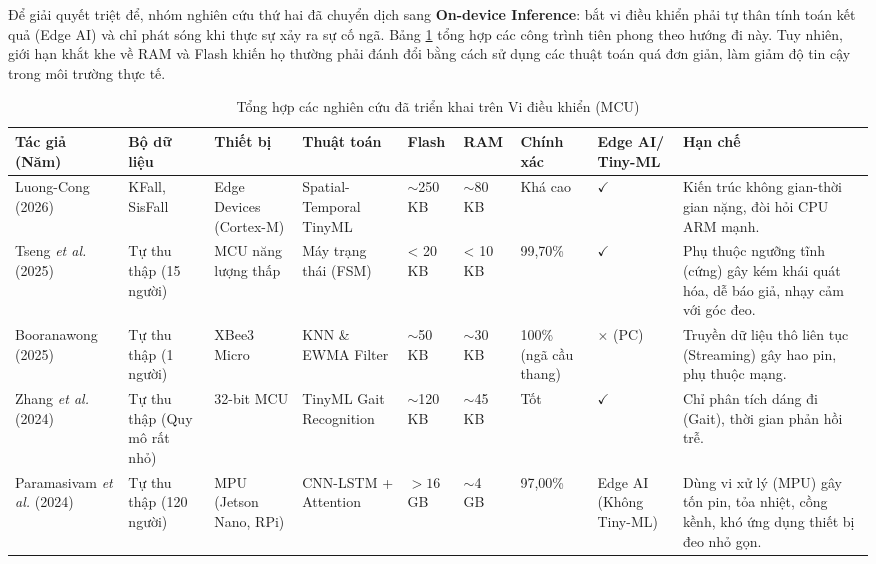 \documentclass[../DoAn.tex]{subfiles}
\begin{document}
Để giải quyết triệt để, nhóm nghiên cứu thứ hai đã chuyển dịch sang \textbf{On-device Inference}: bắt vi điều khiển phải tự thân tính toán kết quả (Edge AI) và chỉ phát sóng khi thực sự xảy ra sự cố ngã. Bảng \ref{tab:survey_mcu} tổng hợp các công trình tiên phong theo hướng đi này. Tuy nhiên, giới hạn khắt khe về RAM và Flash khiến họ thường phải đánh đổi bằng cách sử dụng các thuật toán quá đơn giản, làm giảm độ tin cậy trong môi trường thực tế.

\begin{table}[H]
    \centering
    \caption{Tổng hợp các nghiên cứu đã triển khai trên Vi điều khiển (MCU)}
    \label{tab:survey_mcu}
    \small
    \begin{tabular}{|p{2.2cm}|p{1.5cm}|p{1.5cm}|p{1.5cm}|p{1.0cm}|p{1.0cm}|p{1.2cm}|p{1.0cm}|p{2.5cm}|}
        \hline
        \textbf{Tác giả (Năm)} & \textbf{Bộ dữ liệu} & \textbf{Thiết bị} & \textbf{Thuật toán} & \textbf{Flash} & \textbf{RAM} & \textbf{Chính xác} & \textbf{Edge AI/ Tiny-ML} & \textbf{Hạn chế} \\
        \hline
        Luong-Cong (2026) \cite{LuongCong2026Energy} & KFall, SisFall & Edge Devices (Cortex-M) & Spatial-Temporal TinyML & $\sim$250 KB & $\sim$80 KB & Khá cao & $\checkmark$ & Kiến trúc không gian-thời gian nặng, đòi hỏi CPU ARM mạnh. \\
        \hline
        Tseng \textit{et al.} (2025) \cite{tseng2025wearable} & Tự thu thập (15 người) & MCU năng lượng thấp & Máy trạng thái (FSM) & < 20 KB & < 10 KB & 99,70\% & $\checkmark$ & Phụ thuộc ngưỡng tĩnh (cứng) gây kém khái quát hóa, dễ báo giả, nhạy cảm với góc đeo. \\
        \hline
        Booranawong (2025) \cite{booranawong2025stairs} & Tự thu thập (1 người) & XBee3 Micro & KNN \& EWMA Filter & $\sim$50 KB & $\sim$30 KB & 100\% (ngã cầu thang) & $\times$ (PC) & Truyền dữ liệu thô liên tục (Streaming) gây hao pin, phụ thuộc mạng. \\
        \hline
        Zhang \textit{et al.} (2024) \cite{zhang2024gait} & Tự thu thập (Quy mô rất nhỏ) & 32-bit MCU & TinyML Gait Recognition & $\sim$120 KB & $\sim$45 KB & Tốt & $\checkmark$ & Chỉ phân tích dáng đi (Gait), thời gian phản hồi trễ. \\
        \hline
        Paramasivam \textit{et al.} (2024) \cite{Paramasivam2024Heliyon} & Tự thu thập (120 người) & MPU (Jetson Nano, RPi) & CNN-LSTM + Attention & $>16$ GB & $\sim$4 GB & 97,00\% & Edge AI (Không Tiny-ML) & Dùng vi xử lý (MPU) gây tốn pin, tỏa nhiệt, cồng kềnh, khó ứng dụng thiết bị đeo nhỏ gọn. \\
        \hline
    \end{tabular}
\end{table}
\end{document}
